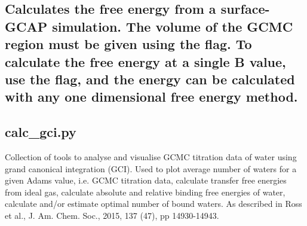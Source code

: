 \documentclass[letterpaper,10pt,english]{sphinxmanual}
\begin{document}


\subsection{Calculates the free energy from a surface-GCAP simulation. The volume of the GCMC region must be given using the  flag. To calculate the free energy at a single B value, use the  flag, and the energy can be calculated with any one dimensional free energy method.}
\label{\detokenize{tools:calculates-the-free-energy-from-a-surface-gcap-simulation-the-volume-of-the-gcmc-region-must-be-given-using-the-v-flag-to-calculate-the-free-energy-at-a-single-b-value-use-the-subdir-flag-and-the-energy-can-be-calculated-with-any-one-dimensional-free-energy-method}}

\subsection{calc\_gci.py}
\label{\detokenize{tools:calc-gci-py}}

%
\begin{sphinxVerbatim}[commandchars=\\\{\}]
    
      
     
     
\end{sphinxVerbatim}


Collection of tools to analyse and visualise GCMC titration data of water using grand canonical integration (GCI). Used to plot average number of waters for a given Adams value, i.e. GCMC titration data, calculate transfer free energies from ideal gas, calculate absolute and relative binding free energies of water, calculate and/or estimate optimal number of bound waters. As described in Ross et al., J. Am. Chem. Soc., 2015, 137 (47), pp 14930-14943.
\end{document}
